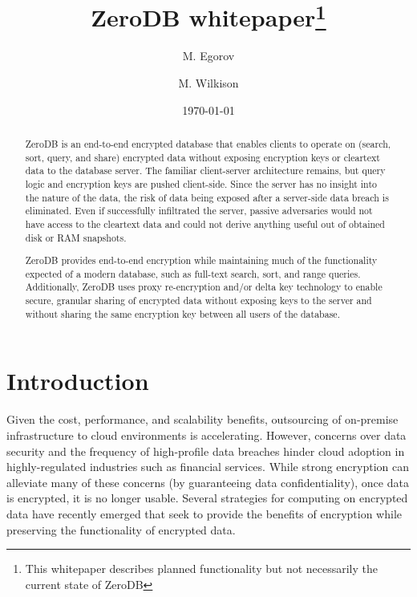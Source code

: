 \documentclass[notitlepage,longbibliography]{revtex4-1}
\begin{document}
\title{ZeroDB whitepaper\footnote{This whitepaper describes planned functionality but not necessarily the current state of ZeroDB}}

\author{M. Egorov}
\author{M. Wilkison}

\begin{abstract}
ZeroDB is an end-to-end encrypted database that enables clients to operate on (search, sort, query, and share) encrypted data without exposing encryption keys or cleartext data to the database server.
The familiar client-server architecture remains, but query logic and encryption keys are pushed client-side.
Since the server has no insight into the nature of the data, the risk of data being exposed after a server-side data breach is eliminated.
Even if successfully infiltrated the server, passive adversaries would not have access to the cleartext data and
could not derive anything useful out of obtained disk or RAM snapshots.

ZeroDB provides end-to-end encryption while maintaining much of the functionality expected of a modern database, such as full-text search, sort, and range queries.
Additionally, ZeroDB uses proxy re-encryption and/or delta key technology to enable secure, granular sharing of encrypted data without exposing keys to the server and without sharing the same encryption key between all users of the database.
\end{abstract}

\date{\today}
\maketitle

\section{Introduction}

Given the cost, performance, and scalability benefits, outsourcing of on-premise infrastructure to cloud environments is accelerating.
However, concerns over data security and the frequency of high-profile data breaches hinder cloud adoption in highly-regulated industries such as financial services.
While strong encryption can alleviate many of these concerns (by guaranteeing data confidentiality), once data is encrypted, it is no longer usable.
Several strategies for computing on encrypted data have recently emerged that seek to provide the benefits of encryption while preserving the functionality of encrypted data.
\end{document}
